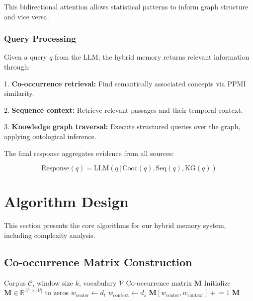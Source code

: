\documentclass[conference]{IEEEtran}
\begin{document}
This bidirectional attention allows statistical patterns to inform graph structure and vice versa.

\subsubsection{Query Processing}

Given a query $q$ from the LLM, the hybrid memory returns relevant information through:

1. \textbf{Co-occurrence retrieval:} Find semantically associated concepts via PPMI similarity.

2. \textbf{Sequence context:} Retrieve relevant passages and their temporal context.

3. \textbf{Knowledge graph traversal:} Execute structured queries over the graph, applying ontological inference.

The final response aggregates evidence from all sources:

\begin{equation}
\text{Response}(q) = \text{LLM}\left(q \,|\, \text{Cooc}(q), \text{Seq}(q), \text{KG}(q)\right)
\end{equation}

\section{Algorithm Design}

This section presents the core algorithms for our hybrid memory system, including complexity analysis.

\subsection{Co-occurrence Matrix Construction}

\begin{algorithm}
\caption{Co-occurrence Matrix Construction}
\begin{algorithmic}[1]
\REQUIRE Corpus $\mathcal{C}$, window size $k$, vocabulary $\mathcal{V}$
\ENSURE Co-occurrence matrix $\mathbf{M}$
\STATE Initialize $\mathbf{M} \in \mathbb{R}^{|\mathcal{V}| \times |\mathcal{V}|}$ to zeros
        \STATE $w_{\text{center}} \leftarrow d_t$
                \STATE $w_{\text{context}} \leftarrow d_s$
                \STATE $\mathbf{M}[w_{\text{center}}, w_{\text{context}}] \mathrel{+}= 1$
            \ENDIF
        \ENDFOR
    \ENDFOR
\ENDFOR
\RETURN $\mathbf{M}$
\end{algorithmic}
\end{algorithm}
\end{document}
